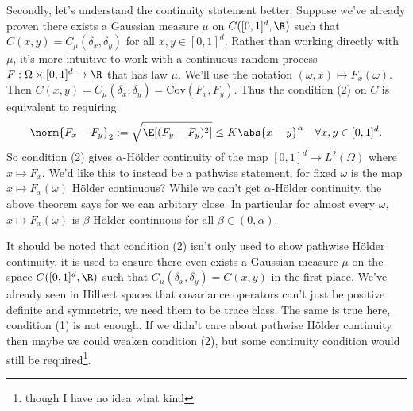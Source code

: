 \documentclass[fontsize=12pt, DIV=10]{scrreprt}
\theoremstyle{mydefn}
\theoremstyle{remark}
\newcommand{\defeq}{:=}
\begin{document}
Secondly, let's understand the continuity statement better. Suppose we've already proven there exists a Gaussian measure $\mu$ on $C([0, 1]^d, \R)$ such that $C(x, y) = C_{\mu}(\delta_x, \delta_y)$ for all $x, y \in [0, 1]^d$. Rather than working directly with $\mu$, it's more intuitive to work with a continuous random process $F: \Omega \times [0, 1]^d \to \R$ that has law $\mu$. We'll use the notation $(\omega, x) \mapsto F_x(\omega)$. Then $C(x, y) = C_{\mu}(\delta_x, \delta_y) = \text{Cov}(F_x, F_y)$. Thus the condition (2) on $C$ is equivalent to requiring
\begin{equation}
	\norm{F_x - F_y}_2 \defeq \sqrt{\E[(F_y - F_y)^2]} \leq K \abs{x - y}^{\alpha} \quad \forall x, y \in [0, 1]^d.
\end{equation}
So condition (2) gives $\alpha$-H\"older continuity of the map $[0, 1]^d \to L^2(\Omega)$ where $x \mapsto F_x$. We'd like this to instead be a pathwise statement, for fixed $\omega$ is the map $x \mapsto F_x(\omega)$ H\"older continuous? While we can't get $\alpha$-H\"older continuity, the above theorem says for we can arbitary close. In particular for almost every $\omega$, $x \mapsto F_x(\omega)$ is $\beta$-H\"older continuous for all $\beta \in (0, \alpha)$.

It should be noted that condition (2) isn't only used to show pathwise H\"older continuity, it is used to ensure there even exists a Gaussian measure $\mu$ on  the space $C([0, 1]^d, \R)$ such that $C_{\mu}(\delta_x, \delta_y) = C(x, y)$ in the first place. We've already seen in Hilbert spaces that covariance operators can't just be positive definite and symmetric, we need them to be trace class. The same is true here, condition (1) is not enough. If we didn't care about pathwise H\"older continuity then maybe we could weaken condition (2), but some continuity condition would still be required\footnote{though I have no idea what kind}.
\end{document}
